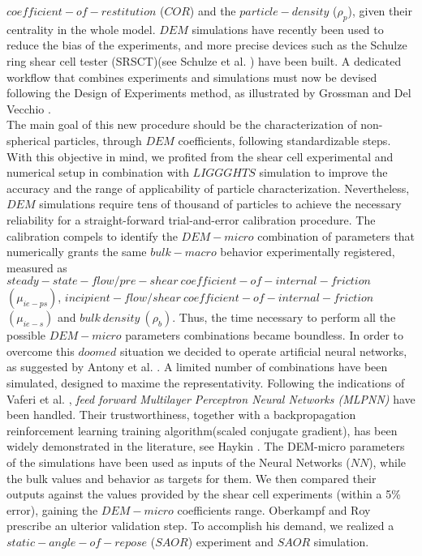 $coefficient-of-restitution$ ($COR$) and the $particle-density$ ($\rho_p$),
given their centrality in the whole model.
$DEM$ simulations have recently been used to reduce the bias of the experiments, and more precise devices such as the Schulze ring shear cell tester (SRSCT)(see Schulze 
et al. \cite{RefWorks:104})
have been built.
A dedicated workflow that combines experiments and simulations must now be devised following the Design of Experiments method, as illustrated by Grossman and Del Vecchio \cite{RefWorks:116}.\\
The main goal of this new procedure should be the characterization of
non-spherical particles, through $DEM$ coefficients,
following standardizable steps.
With this objective in mind, we profited from the shear cell experimental and numerical setup in combination with $LIGGGHTS$ simulation to improve the accuracy and the range of
applicability of particle characterization.
Nevertheless, $DEM$ simulations require tens of thousand of particles to achieve the necessary reliability for a straight-forward trial-and-error calibration procedure.
The calibration compels to identify the $DEM-micro$ combination of parameters that numerically grants the same $bulk-macro$ behavior experimentally registered, measured as
$steady-state-flow/pre-shear ~ coefficient-of-internal-friction $ $ (\mu_{ie-ps})$, $incipient-flow/shear ~ coefficient-of-internal-friction $ $ (\mu_{ie-s})$ and $bulk ~ density ~
(\rho_b)$.
Thus, the time necessary to perform all the possible $DEM-micro$ parameters combinations became boundless.
In order to overcome this $doomed$ situation we decided to operate artificial
neural networks, as suggested by Antony et al. \cite{RefWorks:161}.
A limited number of combinations have been simulated, designed to maxime the representativity.
Following the indications of Vaferi et al. \cite{RefWorks:150}, \textit{feed forward Multilayer Perceptron Neural Networks (MLPNN)} have been handled.
Their trustworthiness, together with a backpropagation reinforcement learning training algorithm(scaled conjugate gradient), has been widely demonstrated in the literature, see
Haykin \cite{RefWorks:158}.
The DEM-micro parameters of the simulations have been used as inputs of the
Neural Networks ($NN$), while the bulk values and behavior as targets for them.
We then compared their outputs against the values provided by the shear cell
experiments (within a 5\% error), gaining the $DEM-micro$ coefficients range.
Oberkampf and Roy \cite{RefWorks:160} prescribe an ulterior validation step.
To accomplish his demand, we realized a $static-angle-of-repose$ ($SAOR$) experiment and $SAOR$ simulation.
